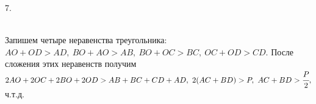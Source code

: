 7. \begin{figure}[ht!]
\end{figure}\\
Запишем четыре неравенства треугольника: $AO+OD>AD,\ BO+AO>AB,\ BO+OC>BC,\ OC+OD>CD.$ После сложения этих неравенств получим $2AO+2OC+2BO+2OD>AB+BC+CD+AD,\ 2(AC+BD)>P,\ AC+BD>\cfrac{P}{2},$ ч.т.д.\\

